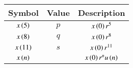 \begin{tabular}{|c|c|c|}
    \hline
            \textbf{Symbol} & \textbf{Value} & \textbf{Description} \\
    \hline
          $x\left(5\right)$ & $p$ & $x\left(0\right)r^5$ \\
    \hline
          $x\left(8\right)$ & $q$ & $x\left(0\right)r^8$\\
    \hline 
          $x\left({11}\right)$ &$s$ &$x\left(0\right)r^{11}$ \\
    \hline
          $x\left(n\right)$ & &$x\left(0\right)r^nu\left(n\right)$ \\
    \hline
  \end{tabular}
